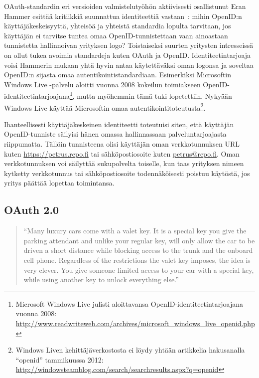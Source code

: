 \documentclass[finnish,gradu]{tktltiki}
\begin{document}
    OAuth-standardin eri versioiden valmistelutyöhön aktiivisesti osallistunut Eran Hammer esittää kritiikkiä suunnattua identiteettiä vastaan~\cite{hueniverse_openid_crisis}: mihin OpenID:n käyttäjäkeskeisyyttä, yhteisöä ja yhteistä standardia lopulta tarvitaan, jos käyttäjän ei tarvitse tuntea omaa OpenID-tunnistettaan vaan ainoastaan tunnistetta hallinnoivan yrityksen logo? Toistaiseksi suurten yritysten intresseissä on ollut tukea avoimia standardeja kuten OAuth ja OpenID. Identiteetintarjoaja voisi Hammerin mukaan yhtä hyvin antaa käytettäväksi oman logonsa ja soveltaa OpenID:n sijasta omaa autentikointistandardiaan. Esimerkiksi Microsoftin Windows Live -palvelu aloitti vuonna 2008  kokeilun toimiakseen OpenID-identiteetintarjoajana\footnote{Microsoft Windows Live julisti aloittavansa OpenID-identiteetintarjoajana vuonna 2008: \\ \url{http://www.readwriteweb.com/archives/microsoft_windows_live_openid.php}},
  mutta myöhemmin tämä tuki lopetettiin. Nykyään Windows Live käyttää Microsoftin omaa autentikointitoteutusta\footnote{Windows Liven kehittäjäverkostosta ei löydy yhtään artikkelia hakusanalla ``openid'' tammikuussa 2012: \url{http://windowsteamblog.com/search/searchresults.aspx?q=openid}}.

  Ihanteellisesti käyttäjäkeskeinen identiteetti toteutuisi siten, että käyttäjän OpenID-tunniste säilyisi hänen omassa hallinnassaan palveluntarjoajasta riippumatta. Tällöin tunnisteena olisi käyttäjän oman verkkotunnuksen URL kuten \url{https://petrus.repo.fi} tai sähköpostiosoite kuten \url{petrus@repo.fi}. Oman verkkotunnuksen voi säilyttää sukupolvelta toiselle, kun taas yrityksen nimeen kytketty verkkotunnus tai sähköpostiosoite todennäköisesti poistuu käytöstä, jos yritys päättää lopettaa toimintansa.





  \subsection{OAuth 2.0} %
  \label{sub:oauth}

  \begin{quote}
    ``Many luxury cars come with a valet key. It is a special key you give the parking attendant and unlike your regular key, will only allow the car to be driven a short distance while blocking access to the trunk and the onboard cell phone. Regardless of the restrictions the valet key imposes, the idea is very clever. You give someone limited access to your car with a special key, while using another key to unlock everything else.''~\cite{hueniverse_oauth_intro}
  \end{quote}
\end{document}
